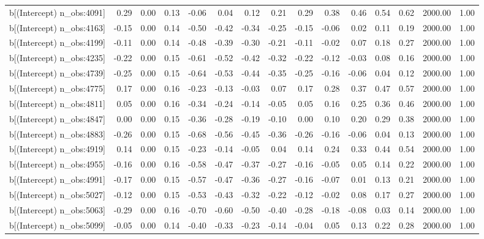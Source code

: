 \begin{table}[ht]
\begin{tabular}{rrrrrrrrrrrrrrr}
  b[(Intercept) n\_obs:4091] & 0.29 & 0.00 & 0.13 & -0.06 & 0.04 & 0.12 & 0.21 & 0.29 & 0.38 & 0.46 & 0.54 & 0.62 & 2000.00 & 1.00 \\ 
  b[(Intercept) n\_obs:4163] & -0.15 & 0.00 & 0.14 & -0.50 & -0.42 & -0.34 & -0.25 & -0.15 & -0.06 & 0.02 & 0.11 & 0.19 & 2000.00 & 1.00 \\ 
  b[(Intercept) n\_obs:4199] & -0.11 & 0.00 & 0.14 & -0.48 & -0.39 & -0.30 & -0.21 & -0.11 & -0.02 & 0.07 & 0.18 & 0.27 & 2000.00 & 1.00 \\ 
  b[(Intercept) n\_obs:4235] & -0.22 & 0.00 & 0.15 & -0.61 & -0.52 & -0.42 & -0.32 & -0.22 & -0.12 & -0.03 & 0.08 & 0.16 & 2000.00 & 1.00 \\ 
  b[(Intercept) n\_obs:4739] & -0.25 & 0.00 & 0.15 & -0.64 & -0.53 & -0.44 & -0.35 & -0.25 & -0.16 & -0.06 & 0.04 & 0.12 & 2000.00 & 1.00 \\ 
  b[(Intercept) n\_obs:4775] & 0.17 & 0.00 & 0.16 & -0.23 & -0.13 & -0.03 & 0.07 & 0.17 & 0.28 & 0.37 & 0.47 & 0.57 & 2000.00 & 1.00 \\ 
  b[(Intercept) n\_obs:4811] & 0.05 & 0.00 & 0.16 & -0.34 & -0.24 & -0.14 & -0.05 & 0.05 & 0.16 & 0.25 & 0.36 & 0.46 & 2000.00 & 1.00 \\ 
  b[(Intercept) n\_obs:4847] & 0.00 & 0.00 & 0.15 & -0.36 & -0.28 & -0.19 & -0.10 & 0.00 & 0.10 & 0.20 & 0.29 & 0.38 & 2000.00 & 1.00 \\ 
  b[(Intercept) n\_obs:4883] & -0.26 & 0.00 & 0.15 & -0.68 & -0.56 & -0.45 & -0.36 & -0.26 & -0.16 & -0.06 & 0.04 & 0.13 & 2000.00 & 1.00 \\ 
  b[(Intercept) n\_obs:4919] & 0.14 & 0.00 & 0.15 & -0.23 & -0.14 & -0.05 & 0.04 & 0.14 & 0.24 & 0.33 & 0.44 & 0.54 & 2000.00 & 1.00 \\ 
  b[(Intercept) n\_obs:4955] & -0.16 & 0.00 & 0.16 & -0.58 & -0.47 & -0.37 & -0.27 & -0.16 & -0.05 & 0.05 & 0.14 & 0.22 & 2000.00 & 1.00 \\ 
  b[(Intercept) n\_obs:4991] & -0.17 & 0.00 & 0.15 & -0.57 & -0.47 & -0.36 & -0.27 & -0.16 & -0.07 & 0.01 & 0.13 & 0.21 & 2000.00 & 1.00 \\ 
  b[(Intercept) n\_obs:5027] & -0.12 & 0.00 & 0.15 & -0.53 & -0.43 & -0.32 & -0.22 & -0.12 & -0.02 & 0.08 & 0.17 & 0.27 & 2000.00 & 1.00 \\ 
  b[(Intercept) n\_obs:5063] & -0.29 & 0.00 & 0.16 & -0.70 & -0.60 & -0.50 & -0.40 & -0.28 & -0.18 & -0.08 & 0.03 & 0.14 & 2000.00 & 1.00 \\ 
  b[(Intercept) n\_obs:5099] & -0.05 & 0.00 & 0.14 & -0.40 & -0.33 & -0.23 & -0.14 & -0.04 & 0.05 & 0.13 & 0.22 & 0.28 & 2000.00 & 1.00 \\ 

\end{tabular}
\end{table}
